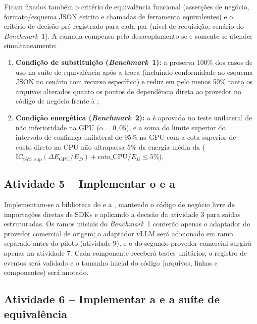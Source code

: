 Ficam fixados também o critério de equivalência funcional (asserções de negócio,
formato/esquema JSON estrito e chamadas de ferramenta equivalentes) e o critério
de decisão pré-registrado para cada par (nível de requisição, cenário do
\textit{Benchmark}~1). A camada compensa pelo desacoplamento se e somente se
atender simultaneamente:
\begin{enumerate}
  \item \textbf{Condição de substituição (\textit{Benchmark}~1):} a \versaoH{}
        preserva 100\% dos casos de uso na suíte de equivalência após a troca
        (incluindo conformidade ao esquema JSON no cenário com recurso
        específico) e reduz em pelo menos 50\% tanto os arquivos alterados
        quanto os pontos de dependência direta ao provedor no código de negócio
        frente à \versaoD{};
  \item \textbf{Condição energética (\textit{Benchmark}~2):} a \versaoH{} é
        aprovada no teste unilateral de não inferioridade na GPU
        ($\alpha = 0{,}05$), e a soma do limite superior do intervalo de
        confiança unilateral de 95\% na GPU com a cota superior de custo direto
        na CPU não ultrapassa 5\% da energia média da \versaoD{}
        ($\mathrm{IC}_{95\%,\mathrm{sup}}(\Delta E_{\mathrm{GPU}}/E_D) + \mathrm{cota\_CPU}/E_D \le 5\%$).
\end{enumerate}

\subsection{Atividade 5 -- Implementar o \harness{} e a \versaoH}
\label{subsec:at-versao-h}

Implementam-se a biblioteca do \harness{} e a \versaoH{}, mantendo o código de
negócio livre de importações diretas de SDKs e aplicando a decisão da atividade 3
para saídas estruturadas. Os ramos iniciais do \textit{Benchmark}~1 conterão
apenas o adaptador do provedor comercial de origem; o adaptador vLLM será
adicionado em ramo separado antes do piloto (atividade 9), e o do segundo
provedor comercial surgirá apenas na atividade 7. Cada componente receberá
testes unitários, o registro de eventos será validado e o tamanho inicial do
código (arquivos, linhas e componentes) será anotado.

\subsection{Atividade 6 -- Implementar a \versaoD{} e a suíte de equivalência}
\label{subsec:at-versao-d}

